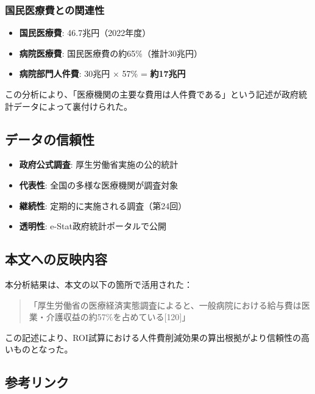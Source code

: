 \documentclass[
  a4paper,
  a4paper,
  11pt]{ltjsbook}
\providecommand{\tightlist}{%
  \setlength{\itemsep}{0pt}\setlength{\parskip}{0pt}}
\begin{document}
\subsubsection{国民医療費との関連性}\label{ux56fdux6c11ux533bux7642ux8cbbux3068ux306eux95a2ux9023ux6027}

\begin{itemize}
\tightlist
\item
  \textbf{国民医療費}: 46.7兆円（2022年度）
\item
  \textbf{病院医療費}: 国民医療費の約65\%（推計30兆円）
\item
  \textbf{病院部門人件費}: 30兆円 × 57\% = \textbf{約17兆円}
\end{itemize}

この分析により、「医療機関の主要な費用は人件費である」という記述が政府統計データによって裏付けられた。

\subsection{データの信頼性}\label{ux30c7ux30fcux30bfux306eux4fe1ux983cux6027}

\begin{itemize}
\tightlist
\item
  \textbf{政府公式調査}: 厚生労働省実施の公的統計
\item
  \textbf{代表性}: 全国の多様な医療機関が調査対象
\item
  \textbf{継続性}: 定期的に実施される調査（第24回）
\item
  \textbf{透明性}: e-Stat政府統計ポータルで公開
\end{itemize}

\subsection{本文への反映内容}\label{ux672cux6587ux3078ux306eux53cdux6620ux5185ux5bb9}

本分析結果は、本文の以下の箇所で活用された：

\begin{quote}
「厚生労働省の医療経済実態調査によると、一般病院における給与費は医業・介護収益の約57\%を占めている{[}120{]}」
\end{quote}

この記述により、ROI試算における人件費削減効果の算出根拠がより信頼性の高いものとなった。

\subsection{参考リンク}\label{ux53c2ux8003ux30eaux30f3ux30af}
\end{document}
